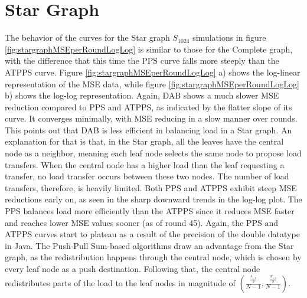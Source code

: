 \section{Star Graph}\label{sec:stargraph}
The behavior of the curves for the Star graph $S_{1024}$ simulations in figure \ref{fig:stargraphMSEperRoundLogLog} is similar to those for the Complete graph, with the difference that this time the PPS curve falls more steeply than the ATPPS curve. Figure \ref{fig:stargraphMSEperRoundLogLog} a) shows the log-linear representation of the MSE data, while figure \ref{fig:stargraphMSEperRoundLogLog} b) shows the log-log representation. Again, DAB shows a much slower MSE reduction compared to PPS and ATPPS, as indicated by the flatter slope of its curve. It converges minimally, with MSE reducing in a slow manner over rounds. This points out that DAB is less efficient in balancing load in a Star graph. An explanation for that is that, in the Star graph, all the leaves have the central node as a neighbor, meaning each leaf node selects the same node to propose load transfers. When the central node has a higher load than the leaf requesting a transfer, no load transfer occurs between these two nodes. The number of load transfers, therefore, is heavily limited. Both PPS and ATPPS exhibit steep MSE reductions early on, as seen in the sharp downward trends in the log-log plot. The PPS balances load more efficiently than the ATPPS since it reduces MSE faster and reaches lower MSE values sooner (as of round 45). Again, the PPS and ATPPS curves start to plateau as a result of the precision of the double datatype in Java. The Push-Pull Sum-based algorithms draw an advantage from the Star graph, as the redistribution happens through the central node, which is chosen by every leaf node as a push destination. Following that, the central node redistributes parts of the load to the leaf nodes in magnitude of $\left(\frac{\frac{s_{i,r}}{2}}{N-1}, \frac{\frac{w_{i,r}}{2}}{N-1}\right)$.

